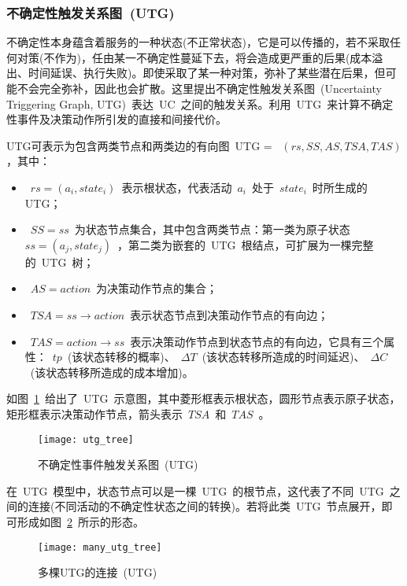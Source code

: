 \subsubsection{不确定性触发关系图~(UTG)~} \label{sec:utg}
不确定性本身蕴含着服务的一种状态(不正常状态)，它是可以传播的，若不采取任何对策(不作为)，任由某一不确定性蔓延下去，将会造成更严重的后果(成本溢出、时间延误、执行失败)。即使采取了某一种对策，弥补了某些潜在后果，但可能不会完全弥补，因此也会扩散。这里提出不确定性触发关系图~(Uncertainty Triggering Graph, UTG)~表达~UC~之间的触发关系。利用~UTG~来计算不确定性事件及决策动作所引发的直接和间接代价。

UTG可表示为包含两类节点和两类边的有向图~UTG = ~$(rs, SS, AS, TSA, TAS)$，其中：
\begin{itemize}
\item ~$rs=(a_i, state_i)$~表示根状态，代表活动~$a_i$~处于~$state_i$~时所生成的UTG；
\item ~$SS={ss}$~为状态节点集合，其中包含两类节点：第一类为原子状态~$ss=(a_j, state_j)$~，第二类为嵌套的~UTG~根结点，可扩展为一棵完整的~UTG~树；
\item ~$AS={action}$~为决策动作节点的集合；
\item ~$TSA=ss \to action$~表示状态节点到决策动作节点的有向边；
\item ~$TAS=action \to ss$~表示决策动作节点到状态节点的有向边，它具有三个属性：~$tp$~(该状态转移的概率)、~$\Delta T$~(该状态转移所造成的时间延迟)、~$\Delta C$~(该状态转移所造成的成本增加)。
\end{itemize}

如图~\ref{figure:utg_tree}~给出了~UTG~示意图，其中菱形框表示根状态，圆形节点表示原子状态，矩形框表示决策动作节点，箭头表示~$TSA$~和~$TAS$~。

\begin{figure}[htbp]
    \centering
    \texttt{[image: utg\_tree]}
    \caption{不确定性事件触发关系图~(UTG)~}\label{figure:utg_tree}
    \vspace{-1em}
\end{figure}

在~UTG~模型中，状态节点可以是一棵~UTG~的根节点，这代表了不同~UTG~之间的连接(不同活动的不确定性状态之间的转换)。若将此类~UTG~节点展开，即可形成如图~\ref{figure:many_utg_tree}~所示的形态。

\begin{figure}[htbp]
    \centering
    \texttt{[image: many\_utg\_tree]}
    \caption{多棵UTG的连接~(UTG)~}\label{figure:many_utg_tree}
    \vspace{-1em}
\end{figure}

